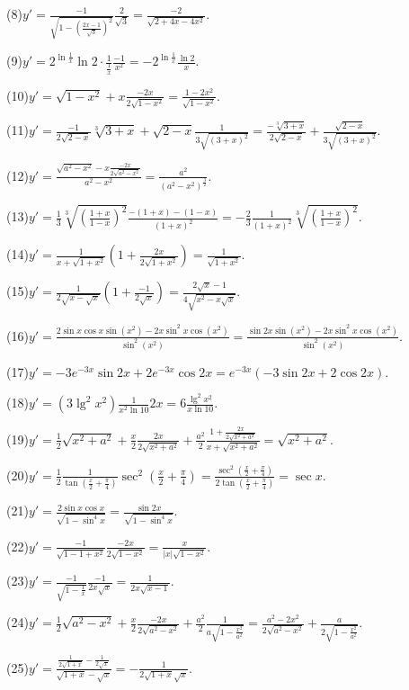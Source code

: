 \documentclass[12pt,UTF8]{ctexart}
\begin{document}
\begin{enumerate}
(8)$y'=\frac{-1}{\sqrt{1-(\frac{2x-1}{\sqrt3})^2}}\frac2{\sqrt3}=\frac{-2}{\sqrt{2+4x-4x^2}}$.

(9)$y'=2^{\ln\frac1x}\ln2\cdot\frac1{\frac1x}\frac{-1}{x^2}=-2^{\ln \frac1x}\frac{\ln2}{x}$.

(10)$y'=\sqrt{1-x^2}+x\frac{-2x}{2\sqrt{1-x^2}}=\frac{1-2x^2}{\sqrt{1-x^2}}$.

(11)$y'=\frac{-1}{2\sqrt{2-x}}\sqrt[3]{3+x}+\sqrt{2-x}\frac1{3\sqrt{(3+x)^2}}=\frac{-\sqrt[3]{3+x}}{2\sqrt{2-x}}+\frac{\sqrt{2-x}}{3\sqrt{(3+x)^2}}$.

(12)$y'=\frac{\sqrt{a^2-x^2}-x\frac{-2x}{2\sqrt{a^2-x^2}}}{a^2-x^2}=\frac{a^2}{(a^2-x^2)^\frac32}$.

(13)$y'=\frac13\sqrt[3]{(\frac{1+x}{1-x})^2}\frac{-(1+x)-(1-x)}{(1+x)^2}=-\frac23\frac1{(1+x)^2}\sqrt[3]{(\frac{1+x}{1-x})^2}$.

(14)$y'=\frac1{x+\sqrt{1+x^2}}(1+\frac{2x}{2\sqrt{1+x^2}})=\frac1{\sqrt{1+x^2}}$.

(15)$y'=\frac1{2\sqrt{x-\sqrt x}}(1+\frac{-1}{2\sqrt x})=\frac{2\sqrt x-1}{4\sqrt{x^2-x\sqrt{x}}}$.

(16)$y'=\frac{2\sin x\cos x\sin(x^2)-2x\sin^2x\cos(x^2)}{\sin^2(x^2)}=\frac{\sin2x\sin(x^2)-2x\sin^2x\cos(x^2)}{\sin^2(x^2)}$.

(17)$y'=-3e^{-3x}\sin2x+2e^{-3x}\cos2x=e^{-3x}(-3\sin2x+2\cos2x)$.

(18)$y'=(3\lg^2x^2)\frac1{x^2\ln10}2x=6\frac{\lg^2x^2}{x\ln10}$.

(19)$y'=\frac12\sqrt{x^2+a^2}+\frac x2\frac{2x}{2\sqrt{x^2+a^2}}+\frac{a^2}2\frac{1+\frac{2x}{2\sqrt{x^2+a^2}}}{x+\sqrt{x^2+a^2}}=\sqrt{x^2+a^2}$.

(20)$y'=\frac12\frac1{\tan(\frac x2+\frac\pi4)}\sec^2(\frac x2+\frac\pi4)=\frac{\sec^2(\frac x2+\frac\pi4)}{2\tan(\frac x2+\frac\pi4)}=\sec x$.

(21)$y'=\frac{2\sin x\cos x}{\sqrt{1-\sin^4x}}=\frac{\sin2x}{\sqrt{1-\sin^4x}}$.

(22)$y'=\frac{-1}{\sqrt{1-1+x^2}}\frac{-2x}{2\sqrt{1-x^2}}=\frac x{|x|\sqrt{1-x^2}}$.

(23)$y'=\frac{-1}{\sqrt{1-\frac1x}}\frac{-1}{2x\sqrt x}=\frac1{2x\sqrt{x-1}}$.

(24)$y'=\frac12\sqrt{a^2-x^2}+\frac x2\frac{-2x}{2\sqrt{a^2-x^2}}+\frac{a^2}2\frac1{a\sqrt{1-\frac{x^2}{a^2}}}=\frac{a^2-2x^2}{2\sqrt{a^2-x^2}}+\frac a{2\sqrt{1-\frac{x^2}{a^2}}}$.

(25)$y'=\frac{\frac1{2\sqrt{1+x}}-\frac1{2\sqrt x}}{\sqrt{1+x}-\sqrt x}=-\frac1{2\sqrt{1+x}\sqrt x}$.


\end{enumerate}
\end{document}
